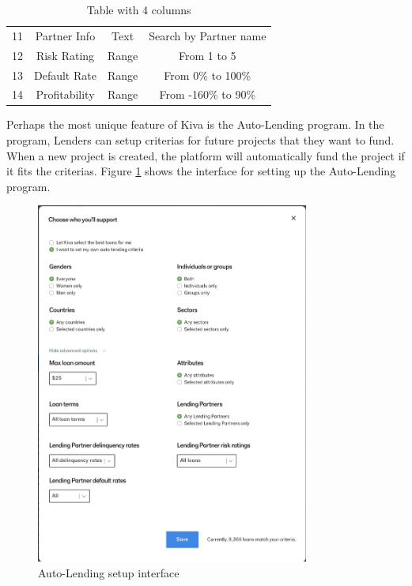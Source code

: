 \begin{table}[H]
{\begin{tabular}{|c|c|c|c|}
            11 & Partner Info                  & Text            & Search by Partner name                                                                                                  \\
            12 & Risk Rating                   & Range           & From 1 to 5                                                                                                             \\
            13 & Default Rate                  & Range           & From 0\% to 100\%                                                                                                       \\
            14 & Profitability                 & Range           & From -160\% to 90\%                                                                                                     \\
            \hline
        \end{tabular}%
    }
    \caption{Table with 4 columns \cite{kiva-browse}}
    \label{tab:browser-criteria}
\end{table}

Perhaps the most unique feature of Kiva is the Auto-Lending program.
In the program, Lenders can setup criterias for future projects that they want to fund.
When a new project is created, the platform will automatically fund the project if it fits the criterias.
Figure \ref{fig:auto-lend-setup} shows the interface for setting up the Auto-Lending program.

\begin{figure}[H]
    \centering
    \includegraphics[width=0.8\textwidth]{images/auto-lend-setup.png}
    \caption{Auto-Lending setup interface \cite{kiva-autolend2}}
    \label{fig:auto-lend-setup}
\end{figure}

